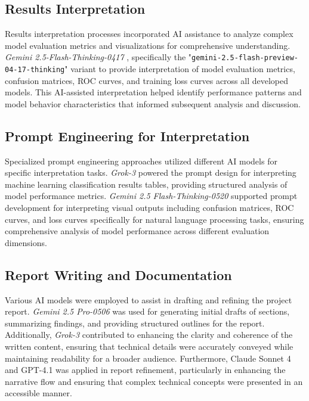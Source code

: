 \subsection{Results Interpretation}

Results interpretation processes incorporated AI assistance to analyze complex model evaluation metrics and visualizations for comprehensive understanding. \textit{Gemini 2.5-Flash-Thinking-0417} \parencite{Doshi_2025}, specifically the "\texttt{gemini-2.5-flash-preview-04-17-thinking}" variant to provide interpretation of model evaluation metrics, confusion matrices, ROC curves, and training loss curves across all developed models. This AI-assisted interpretation helped identify performance patterns and model behavior characteristics that informed subsequent analysis and discussion.

\subsection{Prompt Engineering for Interpretation}

Specialized prompt engineering approaches utilized different AI models for specific interpretation tasks. \textit{Grok-3} \parencite{xGrokBeta} powered the prompt design for interpreting machine learning classification results tables, providing structured analysis of model performance metrics. \textit{Gemini 2.5 Flash-Thinking-0520} \parencite{Doshi_2025} supported prompt development for interpreting visual outputs including confusion matrices, ROC curves, and loss curves specifically for natural language processing tasks, ensuring comprehensive analysis of model performance across different evaluation dimensions.

\subsection{Report Writing and Documentation}

Various AI models were employed to assist in drafting and refining the project report. \textit{Gemini 2.5 Pro-0506} \parencite{2025geminipro} was used for generating initial drafts of sections, summarizing findings, and providing structured outlines for the report. Additionally, \textit{Grok-3} \parencite{xGrokBeta} contributed to enhancing the clarity and coherence of the written content, ensuring that technical details were accurately conveyed while maintaining readability for a broader audience. Furthermore, Claude Sonnet 4 \parencite{claude4} and GPT-4.1 \parencite{opengpt41} was applied in report refinement, particularly in enhancing the narrative flow and ensuring that complex technical concepts were presented in an accessible manner.


